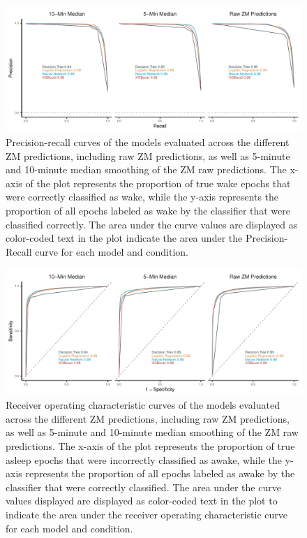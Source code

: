 \documentclass[
  super,
  preprint,
  3p]{elsarticle}
\begin{document}
\begin{figure}[b]

{\centering \includegraphics{visuals/plot_sleep_pr.pdf}

}

\caption{\label{fig-pr_curves}Precision-recall curves of the models
evaluated across the different ZM predictions, including raw ZM
predictions, as well as 5-minute and 10-minute median smoothing of the
ZM raw predictions. The x-axis of the plot represents the proportion of
true wake epochs that were correctly classified as wake, while the
y-axis represents the proportion of all epochs labeled as wake by the
classifier that were classified correctly. The area under the curve
values are displayed as color-coded text in the plot indicate the area
under the Precision-Recall curve for each model and condition.}

\end{figure}

\begin{figure}[b]

{\centering \includegraphics{visuals/plot_sleep_roc.pdf}

}

\caption{\label{fig-roc_curves}Receiver operating characteristic curves
of the models evaluated across the different ZM predictions, including
raw ZM predictions, as well as 5-minute and 10-minute median smoothing
of the ZM raw predictions. The x-axis of the plot represents the
proportion of true asleep epochs that were incorrectly classified as
awake, while the y-axis represents the proportion of all epochs labeled
as awake by the classifier that were correctly classified. The area
under the curve values displayed are displayed as color-coded text in
the plot to indicate the area under the receiver operating
characteristic curve for each model and condition.}

\end{figure}
\end{document}
